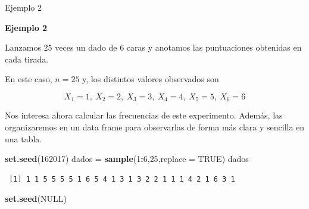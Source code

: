 \documentclass[
  ignorenonframetext,
]{beamer}
\newenvironment{Shaded}{\begin{snugshade}}{\end{snugshade}}
\newcommand{\DataTypeTok}[1]{\textcolor[rgb]{0.13,0.29,0.53}{#1}}
\newcommand{\DecValTok}[1]{\textcolor[rgb]{0.00,0.00,0.81}{#1}}
\newcommand{\KeywordTok}[1]{\textcolor[rgb]{0.13,0.29,0.53}{\textbf{#1}}}
\newcommand{\NormalTok}[1]{#1}
\newcommand{\OperatorTok}[1]{\textcolor[rgb]{0.81,0.36,0.00}{\textbf{#1}}}
\newcommand{\OtherTok}[1]{\textcolor[rgb]{0.56,0.35,0.01}{#1}}
\newcommand{\StringTok}[1]{\textcolor[rgb]{0.31,0.60,0.02}{#1}}
\begin{document}
\begin{frame}[fragile]{Ejemplo 2}
\protect\hypertarget{ejemplo-2}{}

\textbf{Ejemplo 2}

Lanzamos 25 veces un dado de 6 caras y anotamos las puntuaciones
obtenidas en cada tirada.

En este caso, \(n=25\) y, los distintos valores observados son

\[X_1 = 1,\ X_2 = 2,\ X_3 = 3,\ X_4 = 4,\ X_5 = 5,\ X_6 = 6\]

Nos interesa ahora calcular las frecuencias de este experimento. Además,
las organizaremos en un data frame para observarlas de forma más clara y
sencilla en una tabla.

\begin{Shaded}
\begin{Highlighting}[]
\KeywordTok{set.seed}\NormalTok{(}\DecValTok{162017}\NormalTok{)}
\NormalTok{dados =}\StringTok{ }\KeywordTok{sample}\NormalTok{(}\DecValTok{1}\OperatorTok{:}\DecValTok{6}\NormalTok{,}\DecValTok{25}\NormalTok{,}\DataTypeTok{replace =} \OtherTok{TRUE}\NormalTok{)}
\NormalTok{dados}
\end{Highlighting}
\end{Shaded}

\begin{verbatim}
 [1] 1 1 5 5 5 5 1 6 5 4 1 3 1 3 2 2 1 1 1 4 2 1 6 3 1
\end{verbatim}

\begin{Shaded}
\begin{Highlighting}[]
\KeywordTok{set.seed}\NormalTok{(}\OtherTok{NULL}\NormalTok{)}
\end{Highlighting}
\end{Shaded}

\end{frame}
\end{document}
